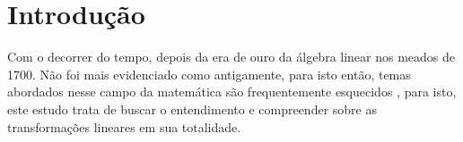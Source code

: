 \chapter{Introdução}
Com o decorrer do tempo, depois da era de ouro da álgebra linear nos meados de 1700. Não foi mais evidenciado como antigamente, para isto então, temas abordados nesse campo da matemática são frequentemente esquecidos
, para isto, este estudo trata de buscar o entendimento e compreender sobre as transformações lineares em sua totalidade.